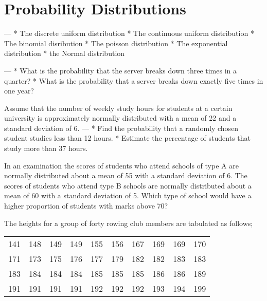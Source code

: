 \section*{Probability Distributions}


--- 
* The discrete uniform distribution
* The continuous uniform distribution
* The binomial disribution
* The poisson distribution
* The exponential distribution
* the Normal distribution


%
--- 
* What is the probability that the server breaks down three times in a quarter?
* What is the probability that a server breaks down exactly five times in one year?


Assume that the number of weekly study hours for students at a certain university
is approximately normally distributed with a mean of 22 and a standard deviation
of 6.
--- 
* Find the probability that a randomly chosen student studies less than 12
hours.
* Estimate the percentage of students that study more than 37 hours.



%
%
%
%
%
%
In an examination the scores of students who attend schools of type A are
normally distributed about a mean of 55 with a standard deviation of 6. The
scores of students who attend type B schools are normally distributed about a
mean of 60 with a standard deviation of 5.
Which type of school would have a higher proportion of students with marks above 70?

The heights for a group of forty rowing club members are tabulated as follows;

\begin{table}[ht]
\begin{center}
\begin{tabular}{|rrrrrrrrrr|}

\hline
141 & 148 & 149 & 149 & 155 & 156 & 167 & 169 & 169 & 170 \\
171 & 173 & 175 & 176 & 177 & 179 & 182 & 182 & 183 & 183 \\
183 & 184 & 184 & 184 & 185 & 185 & 185 & 186 & 186 & 189 \\
191 & 191 & 191 & 191 & 192 & 192 & 192 & 193 & 194 & 199 \\
\hline
\end{tabular}
\end{center}
\end{table}

